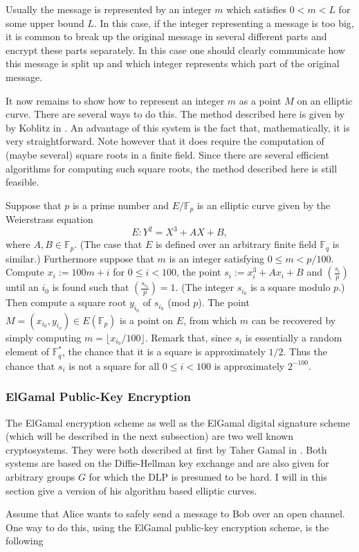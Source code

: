 \documentclass{article}
\numberwithin{equation}{section}
\theoremstyle{definition}
\newcommand{\FF}[1]{{\mathbb F}_{#1}} %
\newcommand{\leg}[2]{\left( \frac{#1}{#2}\right)} %
\begin{document}
Usually the message is represented by an integer $m$ which satisfies $0<m<L$ for some upper bound $L$. In this case, if the integer representing a message is too big, it is common to break up the original message in several different parts and encrypt these parts separately. In this case one should clearly communicate how this message is split up and which integer represents which part of the original message.\par 
It now remains to show how to represent an integer $m$ as a point $M$ on an elliptic curve. There are several ways to do this. The method described here is given by by Koblitz in \cite[VI.2]{Koblitz1}. An advantage of this system is the fact that, mathematically, it is very straightforward. Note however that it does require the computation of (maybe several) square roots in a finite field. Since there are several efficient algorithms for computing such square roots, the method described here is still feasible.\par 
Suppose that $p$ is  a prime number and $E/\FF{p}$ is an elliptic curve given by the Weierstrass equation $$E:Y^2=X^3+AX+B,$$ where $A,B \in \FF{p}$. (The case that $E$ is defined over an arbitrary finite field $\FF{q}$ is similar.) Furthermore suppose that $m$ is an integer satisfying $0 \leq m < p/100$. Compute $x_i := 100 m + i$ for $0 \leq i < 100$, the point $s_i:=x_i^3+Ax_i+B$ and $\leg{s_i}{p}$ until an $i_0$ is found such that $\leg{s_{i_0}}{p} = 1$. (The integer $s_{i_0}$ is a square modulo $p$.) Then compute a square root $y_{i_0}$ of $s_{i_0}$ (mod $p$). The point $M = (x_{i_0},y_{i_o}) \in E(\FF{p})$ is a point on $E$, from which $m$ can be recovered by simply computing $m=\lfloor x_{i_0}/100 \rfloor$. Remark that, since $s_i$ is essentially a random element of $\FF{q}^*$, the chance that it is a square is approximately $1/2$. Thus the chance that $s_i$ is not a square for all $0 \leq i < 100$ is approximately $2^{-100}$.

\subsubsection{ElGamal Public-Key Encryption}
The ElGamal encryption scheme as well as the ElGamal digital signature scheme (which will be described in the next subsection) are two well known cryptosystems. They were both described at first by Taher Gamal in \cite{Gamalpaper} . Both systems are based on the Diffie-Hellman key exchange and are also given for arbitrary groups $G$ for which the DLP is presumed to be hard. I will in this section give a version of his algorithm based elliptic curves.\par 
Assume that Alice wants to safely send a message to Bob over an open channel. One way to do this, using the ElGamal public-key encryption scheme, is the following
\end{document}
